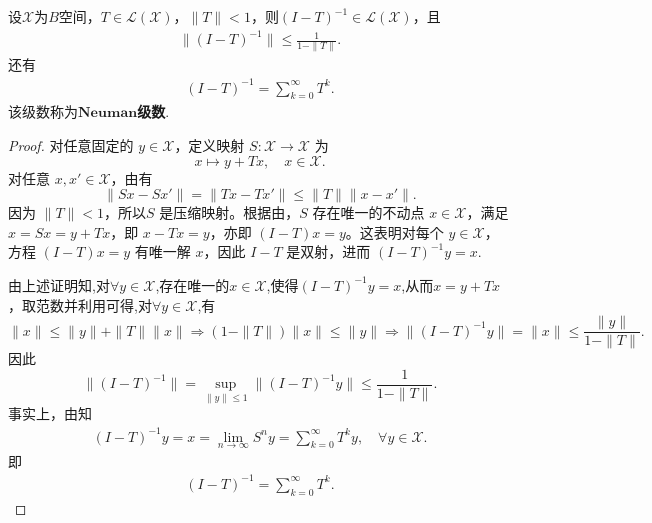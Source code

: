 \documentclass[../../main.tex]{subfiles}%
\begin{document}
\begin{lemma}\label{lemma:泛函分析--纽曼级数}
设$\mathscr{X}$为$B$空间，$T\in\mathscr{L}(\mathscr{X})$，$\|T\|<1$，则$(I-T)^{-1}\in\mathscr{L}(\mathscr{X})$，且
\begin{align}
\|(I-T)^{-1}\|\leqslant\frac{1}{1-\|T\|}.\label{eq:neuman_est}
\end{align}
还有
\begin{align*}
(I-T)^{-1}=\sum\limits_{k=0}^{\infty}T^k.
\end{align*}
该级数称为$\mathbf{Neuman}$\textbf{级数}.
\end{lemma}
\begin{proof}

对任意固定的 \(y\in\mathscr{X}\)，定义映射 \(S:\mathscr{X}\to\mathscr{X}\) 为
\[
x \mapsto y + Tx,\quad x\in\mathscr{X}.
\]
对任意 \(x,x'\in\mathscr{X}\)，由有
\[
\|Sx - Sx'\| = \|Tx - Tx'\| \leqslant \|T\|\|x-x'\|.
\]
因为 \(\|T\|<1\)，所以\(S\) 是压缩映射。根据由，\(S\) 存在唯一的不动点 \(x\in\mathscr{X}\)，满足 \(x = Sx = y + Tx\)，即 \(x - Tx = y\)，亦即 \((I-T)x = y\)。这表明对每个 \(y\in\mathscr{X}\)，方程 \((I-T)x = y\) 有唯一解 \(x\)，因此 \(I-T\) 是双射，进而 \((I-T)^{-1}y = x\).

由上述证明知,对$\forall y\in \mathscr{X}$,存在唯一的$x\in \mathscr{X}$,使得$(I-T)^{-1}y=x$,从而\(x = y + Tx\)，取范数并利用可得,对$\forall y\in \mathscr{X}$,有
\[
\|x\| \leqslant \|y\| + \|T\|\|x\|\Longrightarrow (1-\|T\|)\|x\| \leqslant \|y\|\Longrightarrow \|(I-T)^{-1}y\|=\|x\| \leqslant \frac{\|y\|}{1-\|T\|}.
\]
因此
\[
\|(I-T)^{-1}\| = \sup_{\|y\|\leqslant 1}\|(I-T)^{-1}y\| \leqslant \frac{1}{1-\|T\|}.
\]
事实上，由知
\begin{align*}
(I-T)^{-1}y=x=\lim\limits_{n\to\infty}S^n y=\sum\limits_{k=0}^{\infty}T^k y,\quad \forall y\in \mathscr{X}.
\end{align*}
即
\begin{align*}
(I-T)^{-1}=\sum\limits_{k=0}^{\infty}T^k.
\end{align*}

\end{proof}
\end{document}
